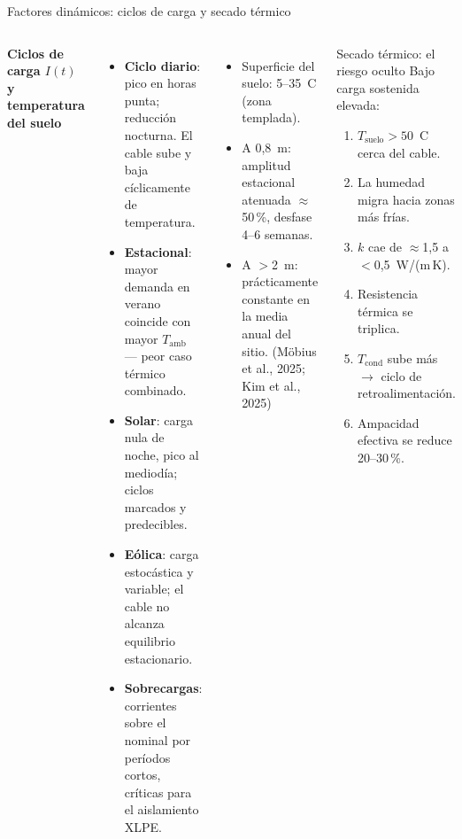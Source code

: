 \documentclass[aspectratio=169]{beamer}
\newcommand{\refcite}[1]{{\footnotesize\color{gray!70!black} #1}}
\begin{document}
\begin{frame}{Factores dinámicos: ciclos de carga y secado térmico}
\begin{columns}[T]
\textbf{\small Ciclos de carga $I(t)$ y temperatura del suelo}
\begin{itemize}[leftmargin=*]\scriptsize
    \item \textbf{Ciclo diario}: pico en horas punta; reducción nocturna.
          El cable sube y baja cíclicamente de temperatura.
    \item \textbf{Estacional}: mayor demanda en verano coincide con mayor
          $T_\text{amb}$ --- peor caso térmico combinado.
    \item \textbf{Solar}: carga nula de noche, pico al mediodía; ciclos
          marcados y predecibles.
    \item \textbf{Eólica}: carga estocástica y variable; el cable no
          alcanza equilibrio estacionario.
    \item \textbf{Sobrecargas}: corrientes sobre el nominal por períodos
          cortos, críticas para el aislamiento XLPE.
\end{itemize}
\vspace{0.2em}
\begin{itemize}[leftmargin=*]\scriptsize
    \item Superficie del suelo: 5--35~\textdegree{}C (zona templada).
    \item A 0{,}8~m: amplitud estacional atenuada $\approx$50\,\%,
          desfase 4--6 semanas.
    \item A $>$2~m: prácticamente constante en la media anual del sitio.
    \refcite{(Möbius et al., 2025; Kim et al., 2025)}
\end{itemize}
\begin{alertblock}{\small Secado térmico: el riesgo oculto}
\scriptsize
Bajo carga sostenida elevada:
\begin{enumerate}[leftmargin=*,itemsep=0pt]
    \item $T_\text{suelo}>50$~\textdegree{}C cerca del cable.
    \item La humedad migra hacia zonas más frías.
    \item $k$ cae de $\approx$1{,}5 a $<$0{,}5~W/(m\,K).
    \item Resistencia térmica se triplica.
    \item $T_\text{cond}$ sube más $\to$ ciclo de retroalimentación.
    \item Ampacidad efectiva se reduce 20--30\,\%.

\end{enumerate}
\end{alertblock}
\end{columns}
\end{frame}
\end{document}

